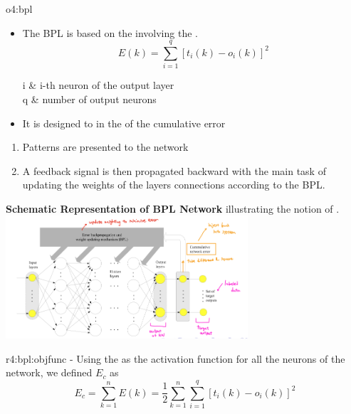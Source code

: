 \documentclass{tron}
\begin{document}
\clearpage
\begin{overview}{o4:bpl}
	\begin{itemize}
		\item The \Gls{BPL} is based on the  involving the .
			\begin{equation}
				E(k) = \sum_{i=1}^q \left[ t_i(k) - o_i(k) \right]^2
			\end{equation}
			\begin{eqconditions}
				i & i-th neuron of the output layer \\
				q & number of output neurons
			\end{eqconditions}
		\item It is designed to  in the  of the cumulative error
	\end{itemize}

	\begin{algo}{}
	\begin{enumerate}
		\item Patterns are presented to the network
		\item A feedback signal is then propagated backward with the main task of updating the weights of the layers connections according to the \Gls{BPL}.
	\end{enumerate}
	\end{algo}
	
	\textbf{Schematic Representation of \Gls{BPL} Network} illustrating the notion of .\\
	\includegraphics[width=340px]{Figs/Lec5/BPL_schematics.png}
	
	\begin{remark}{r4:bpl:objfunc}
		- Using the  as the activation function for all the neurons of the network, we defined $E_c$ as 
		\begin{equation}
			E_c = \sum_{k=1}^n E(k) = \frac{1}{2} \sum_{k=1}^n \sum_{i=1}^q [t_i (k) - o_i (k)]^2
		\end{equation}
		

\end{remark}
\end{overview}
\end{document}
